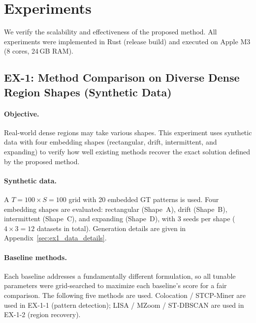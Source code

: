 \section{Experiments}\label{sec:experiments}

We verify the scalability and effectiveness of the proposed method.
All experiments were implemented in Rust (release build)
and executed on Apple M3 (8 cores, 24\,GB RAM).

\subsection{EX-1: Method Comparison on Diverse Dense Region Shapes (Synthetic Data)}
\label{sec:ex1}\label{sec:ex1_1}

\paragraph{Objective.}
Real-world dense regions may take various shapes.
This experiment uses synthetic data with four embedding shapes
(rectangular, drift, intermittent, and expanding)
to verify how well existing methods recover the exact solution
defined by the proposed method.

\paragraph{Synthetic data.}
A $T{=}100 \times S{=}100$ grid with 20 embedded GT patterns is used.
Four embedding shapes are evaluated:
rectangular (Shape~A), drift (Shape~B), intermittent (Shape~C),
and expanding (Shape~D),
with 3 seeds per shape ($4 \times 3 = 12$ datasets in total).
Generation details are given in Appendix~\ref{sec:ex1_data_details}.

\paragraph{Baseline methods.}
Each baseline addresses a fundamentally different formulation,
so all tunable parameters were grid-searched to maximize each baseline's score for a fair comparison.
The following five methods are used.
Colocation / STCP-Miner are used in EX-1-1 (pattern detection);
LISA / MZoom / ST-DBSCAN are used in EX-1-2 (region recovery).

